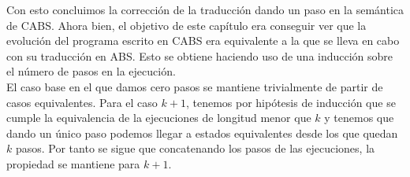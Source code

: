 Con esto concluimos la corrección de la traducción dando un paso en la semántica de CABS. Ahora bien, el objetivo de este capítulo era conseguir ver que la evolución del programa escrito en CABS era equivalente a la que se lleva en cabo con su traducción en ABS. Esto se obtiene haciendo uso de una inducción sobre el número de pasos en la ejecución.\\

El caso base en el que damos cero pasos se mantiene trivialmente de partir de casos equivalentes. Para el caso $k+1$, tenemos por hipótesis de inducción que se cumple la equivalencia de la ejecuciones de longitud menor que $k$ y tenemos que dando un único paso podemos llegar a estados equivalentes desde los que quedan $k$ pasos. Por tanto se sigue que concatenando los pasos de las ejecuciones, la propiedad se mantiene para $k+1$.

